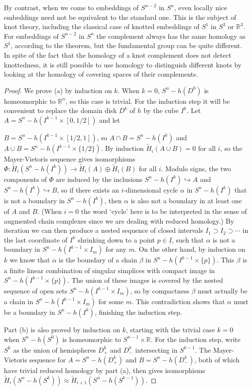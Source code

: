 By contrast, when we come to embeddings of $S^{n-2}$ in $S^n$, even locally nice embeddings need not be equivalent to the standard one. This is the subject of knot theory, including the classical case of knotted embeddings of $S^1$ in $S^3$ or $\mathbb{R}^3$. For embeddings of $S^{n-2}$ in $S^n$ the complement always has the same homology as $S^1$, according to the theorem, but the fundamental group can be quite different. In spite of the fact that the homology of a knot complement does not detect knottedness, it is still possible to use homology to distinguish different knots by looking at the homology of covering spaces of their complements.
\begin{proof}
 We prove (a) by induction on $k$. When $k = 0$, $S^n - h(D^0)$ is homeomorphic to $\mathbb{R}^n$, so this case is trivial. For the induction step it will be convenient to replace the domain disk $D^k$ of $h$ by the cube $I^k$. Let $A = S^n - h(I^{k-1} \times [0, 1/2])$ and let

$B = S^n - h(I^{k-1}\times[1/2, 1])$, so $A \cap B = S^n - h(I^k)$ and $A \cup B = S^n - h(I^{k-1} \times \{1/2\})$. By
induction $\tilde{H}_i(A \cup B) = 0$ for all $i$, so the Mayer-Vietoris sequence gives isomorphisms
$\Phi: \tilde{H}_i(S^n - h(I^k)) \to \tilde{H}_i(A) \oplus \tilde{H}_i(B)$ for all $i$. Modulo signs, the two components of $\Phi$
are induced by the inclusions $S^n - h(I^k) \hookrightarrow A$ and $S^n - h(I^k) \hookrightarrow B$, so if there exists
an $i$-dimensional cycle $\alpha$ in $S^n - h(I^k)$ that is not a boundary in $S^n - h(I^k)$, then
$\alpha$ is also not a boundary in at least one of $A$ and $B$. (When $i = 0$ the word `cycle'
here is to be interpreted in the sense of augmented chain complexes since we are
dealing with reduced homology.) By iteration we can then produce a nested sequence
of closed intervals $I_1 \supset I_2 \supset \cdots$ in the last coordinate of $I^k$ shrinking down to a
point $p \in I$, such that $\alpha$ is not a boundary in $S^n - h(I^{k-1}\times I_m)$ for any $m$. On
the other hand, by induction on $k$ we know that $\alpha$ is the boundary of a chain $\beta$ in
$S^n - h(I^{k-1}\times\{p\})$. This $\beta$ is a finite linear combination of singular simplices with
compact image in $S^n - h(I^{k-1}\times\{p\})$. The union of these images is covered by the
nested sequence of open sets $S^n - h(I^{k-1}\times I_m)$, so by compactness $\beta$ must actually
be a chain in $S^n - h(I^{k-1}\times I_m)$ for some $m$. This contradiction shows that $\alpha$ must
be a boundary in $S^n - h(I^k)$, finishing the induction step.

Part (b) is also proved by induction on $k$, starting with the trivial case $k = 0$ when
$S^n - h(S^0)$ is homeomorphic to $S^{n-1}\times\mathbb{R}$. For the induction step, write $S^k$ as the
union of hemispheres $D_+^k$ and $D_-^k$ intersecting in $S^{k-1}$. The Mayer-Vietoris sequence
for $A = S^n - h(D_+^k)$ and $B = S^n - h(D_-^k)$, both of which have trivial reduced homology
by part (a), then gives isomorphisms $\tilde{H}_i(S^n - h(S^k)) \approx \tilde{H}_{i+1}(S^n - h(S^{k-1}))$.
\end{proof}

